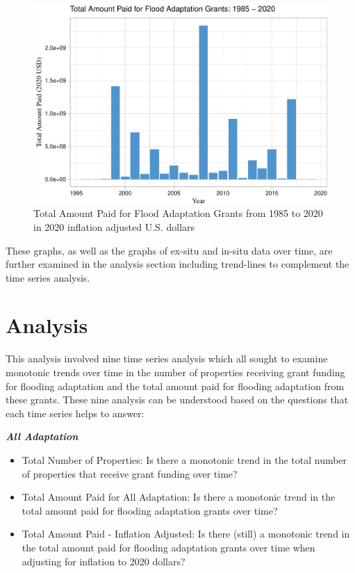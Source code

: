 \documentclass[
  12pt,
]{article}
\begin{document}
\begin{figure}
\centering
\includegraphics{finalreport_files/figure-latex/unnamed-chunk-9-1.pdf}
\caption{Total Amount Paid for Flood Adaptation Grants from 1985 to 2020
in 2020 inflation adjusted U.S. dollars}
\end{figure}

These graphs, as well as the graphs of ex-situ and in-situ data over
time, are further examined in the analysis section including trend-lines
to complement the time series analysis.

\newpage

\hypertarget{analysis}{%
\section{Analysis}\label{analysis}}

This analysis involved nine time series analysis which all sought to
examine monotonic trends over time in the number of properties receiving
grant funding for flooding adaptation and the total amount paid for
flooding adaptation from these grants. These nine analysis can be
understood based on the questions that each time series helps to answer:

\textbf{\emph{All Adaptation}}

\begin{itemize}
\item
  Total Number of Properties: Is there a monotonic trend in the total
  number of properties that receive grant funding over time?
\item
  Total Amount Paid for All Adaptation: Is there a monotonic trend in
  the total amount paid for flooding adaptation grants over time?
\item
  Total Amount Paid - Inflation Adjusted: Is there (still) a monotonic
  trend in the total amount paid for flooding adaptation grants over
  time when adjusting for inflation to 2020 dollars?
\end{itemize}
\end{document}
